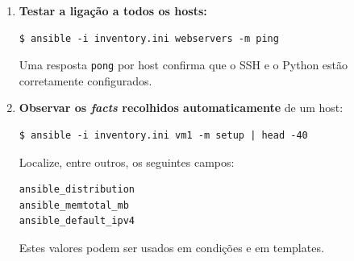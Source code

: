 \documentclass[11pt,a4paper]{article}
\begin{document}
\begin{enumerate}[label=\arabic*.]
  \item \textbf{Testar a ligação a todos os hosts:}
\begin{lstlisting}
$ ansible -i inventory.ini webservers -m ping
\end{lstlisting}
  Uma resposta \texttt{pong} por host confirma que o SSH e o Python estão corretamente configurados.

  \item \textbf{Observar os \emph{facts} recolhidos automaticamente} de um host:
\begin{lstlisting}
$ ansible -i inventory.ini vm1 -m setup | head -40
\end{lstlisting}
  Localize, entre outros, os seguintes campos:
\begin{lstlisting}
ansible_distribution
ansible_memtotal_mb
ansible_default_ipv4
\end{lstlisting}
  Estes valores podem ser usados em condições e em templates.

\end{enumerate}
\end{document}
